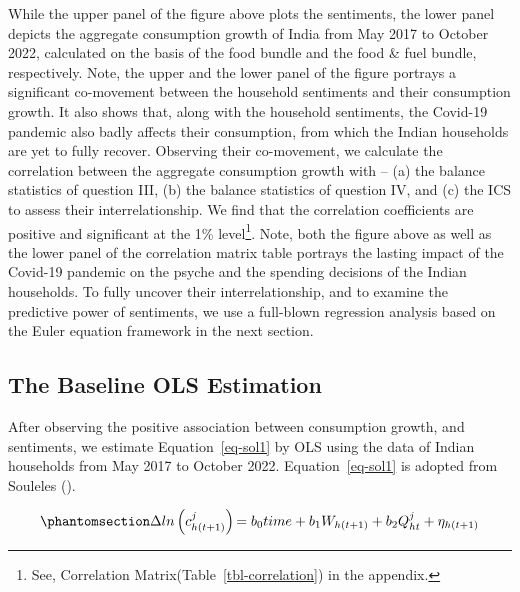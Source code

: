 \documentclass[
  abstract]{scrartcl}
\begin{document}
While the upper panel of the figure above plots the sentiments, the
lower panel depicts the aggregate consumption growth of India from May
2017 to October 2022, calculated on the basis of the food bundle and the
food \& fuel bundle, respectively. Note, the upper and the lower panel
of the figure portrays a significant co-movement between the household
sentiments and their consumption growth. It also shows that, along with
the household sentiments, the Covid-19 pandemic also badly affects their
consumption, from which the Indian households are yet to fully recover.
Observing their co-movement, we calculate the correlation between the
aggregate consumption growth with -- (a) the balance statistics of
question III, (b) the balance statistics of question IV, and (c) the ICS
to assess their interrelationship. We find that the correlation
coefficients are positive and significant at the 1\% level\footnote{See,
  Correlation Matrix(Table~\ref{tbl-correlation}) in the appendix.}.
Note, both the figure above as well as the lower panel of the
correlation matrix table portrays the lasting impact of the Covid-19
pandemic on the psyche and the spending decisions of the Indian
households. To fully uncover their interrelationship, and to examine the
predictive power of sentiments, we use a full-blown regression analysis
based on the Euler equation framework in the next section.

\subsection{The Baseline OLS
Estimation}\label{the-baseline-ols-estimation}

After observing the positive association between consumption growth, and
sentiments, we estimate Equation~\ref{eq-sol1} by OLS using the data of
Indian households from May 2017 to October 2022. Equation~\ref{eq-sol1}
is adopted from Souleles
().

\begin{equation}\phantomsection\label{eq-sol1}{
\Delta ln\left(c_{h\left(t+1\right)}^j\right){=b_0 time+b_1W_{h\left(t+1\right)}}+b_2Q_{ht}^j+\eta_{h\left(t+1\right)}
}\end{equation}
\end{document}
